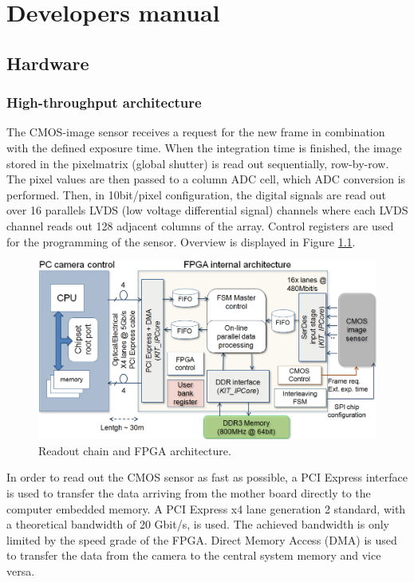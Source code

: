%

\chapter{Developers manual}

\section{Hardware}

\subsection{High-throughput architecture}

The CMOS-image sensor receives a request for the new frame in combination with the defined exposure time. When the integration time is finished, the image stored in the pixelmatrix (global shutter) is read out sequentially, row-by-row. The pixel values are then passed to a column ADC cell, which ADC conversion is performed. Then, in 10bit/pixel configuration, the digital signals are read out over 16 parallels LVDS (low voltage differential signal) channels where each LVDS channel reads out 128 adjacent columns of the array. Control registers are used for the programming of the sensor. Overview is displayed in Figure \ref{fpga-arch}.

\begin{figure}
\includegraphics[width=\textwidth]{images/Figure_3_5.png}
\caption{\label{fpga-arch} Readout chain and FPGA architecture.}
\end{figure}


In order to read out the CMOS sensor as fast as possible, a PCI Express interface is used to transfer the data arriving from the mother board directly to the computer embedded memory. A PCI Express x4 lane generation 2 standard, with a theoretical bandwidth of 20 Gbit/s, is used. The achieved bandwidth is only limited by the speed grade of the FPGA. Direct Memory Access (DMA) is used to transfer the data from the camera to the central system memory and vice versa.

